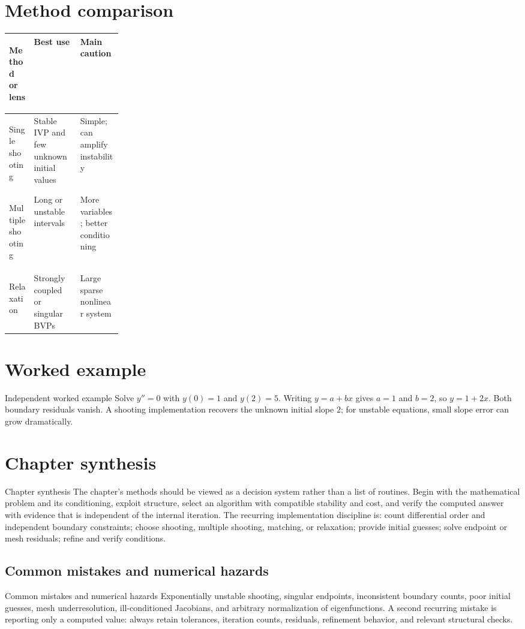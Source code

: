 \documentclass[10pt,letterpaper]{article}
\begin{document}
\section*{Method comparison}
\begin{center}
\small
\begin{tabularx}{\linewidth}{>{\bfseries\raggedright\arraybackslash}p{0.22\linewidth}XX}
\toprule
Method or lens & Best use & Main caution \\
\midrule
Single shooting & Stable IVP and few unknown initial values & Simple; can amplify instability \\
Multiple shooting & Long or unstable intervals & More variables; better conditioning \\
Relaxation & Strongly coupled or singular BVPs & Large sparse nonlinear system \\
\bottomrule
\end{tabularx}
\end{center}

\section*{Worked example}
\begin{exambox}{Independent worked example}
Solve $y''=0$ with $y(0)=1$ and $y(2)=5$.  Writing $y=a+bx$ gives $a=1$ and $b=2$, so $y=1+2x$.  Both boundary residuals vanish.  A shooting implementation recovers the unknown initial slope $2$; for unstable equations, small slope error can grow dramatically.
\end{exambox}

\section*{Chapter synthesis}
\begin{summarybox}{Chapter synthesis}
The chapter's methods should be viewed as a decision system rather than a list of routines.  Begin with the mathematical problem and its conditioning, exploit structure, select an algorithm with compatible stability and cost, and verify the computed answer with evidence that is independent of the internal iteration.  The recurring implementation discipline is: count differential order and independent boundary constraints; choose shooting, multiple shooting, matching, or relaxation; provide initial guesses; solve endpoint or mesh residuals; refine and verify conditions.
\end{summarybox}

\subsection*{Common mistakes and numerical hazards}
\begin{warnbox}{Common mistakes and numerical hazards}
Exponentially unstable shooting, singular endpoints, inconsistent boundary counts, poor initial guesses, mesh underresolution, ill-conditioned Jacobians, and arbitrary normalization of eigenfunctions.  A second recurring mistake is reporting only a computed value: always retain tolerances, iteration counts, residuals, refinement behavior, and relevant structural checks.
\end{warnbox}
\end{document}
